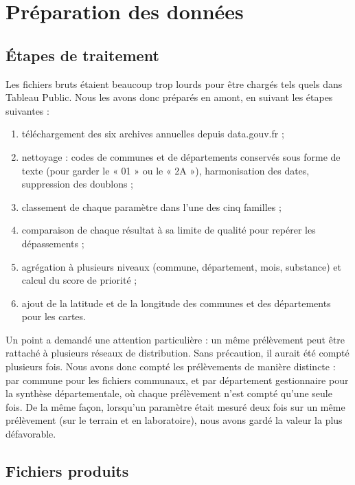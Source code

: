 \documentclass[11pt,a4paper]{article}
\begin{document}
\section{Préparation des données}

\subsection{Étapes de traitement}

Les fichiers bruts étaient beaucoup trop lourds pour être chargés tels quels dans Tableau Public. Nous les avons donc préparés en amont, en suivant les étapes suivantes :

\begin{enumerate}
  \item téléchargement des six archives annuelles depuis data.gouv.fr ;
  \item nettoyage : codes de communes et de départements conservés sous forme de texte (pour garder le « 01 » ou le « 2A »), harmonisation des dates, suppression des doublons ;
  \item classement de chaque paramètre dans l'une des cinq familles ;
  \item comparaison de chaque résultat à sa limite de qualité pour repérer les dépassements ;
  \item agrégation à plusieurs niveaux (commune, département, mois, substance) et calcul du score de priorité ;
  \item ajout de la latitude et de la longitude des communes et des départements pour les cartes.
\end{enumerate}

Un point a demandé une attention particulière : un même prélèvement peut être rattaché à plusieurs réseaux de distribution. Sans précaution, il aurait été compté plusieurs fois. Nous avons donc compté les prélèvements de manière distincte : par commune pour les fichiers communaux, et par département gestionnaire pour la synthèse départementale, où chaque prélèvement n'est compté qu'une seule fois. De la même façon, lorsqu'un paramètre était mesuré deux fois sur un même prélèvement (sur le terrain et en laboratoire), nous avons gardé la valeur la plus défavorable.

\subsection{Fichiers produits}
\end{document}
